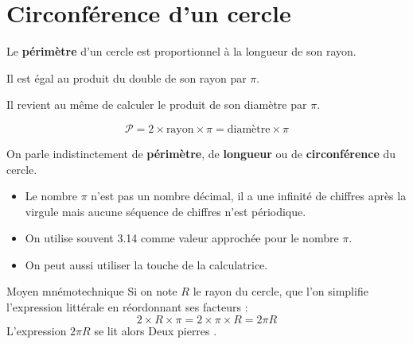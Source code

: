\section{Circonférence d'un cercle}
\begin{propriete}
    Le \textbf{périmètre} d'un cercle est proportionnel à la longueur de son rayon.

    Il est égal au produit du double de son rayon par $\pi$.

    Il revient au même de calculer le produit de son diamètre par $\pi$.

    $${\mathcal P} = 2\times \text{rayon} \times \pi = \text{diamètre}\times \pi$$
\end{propriete}

\begin{myvocabulaire}
    On parle indistinctement de {\bfseries périmètre}, de \textbf{longueur} ou de \textbf{circonférence} du cercle.
\end{myvocabulaire}

\begin{remarques}
    \begin{itemize}
        \item Le nombre $\pi$ n'est pas un nombre décimal, il a une infinité de chiffres après la virgule mais aucune séquence de chiffres n'est périodique.
        \item On utilise souvent \num{3.14} comme valeur approchée pour le nombre $\pi$.
        \item On peut aussi utiliser la touche \Calculatrice{/$\pi$} de la calculatrice.
    \end{itemize}
\end{remarques}

\begin{myBox}{ Moyen mnémotechnique }
    Si on note $R$ le rayon du cercle, que l'on simplifie l'expression littérale en réordonnant ses facteurs :
    $$2\times R \times \pi = 2 \times \pi \times R = 2\pi R$$
    L'expression $2\pi R$ se lit alors \og{} Deux pierres \fg{}.
\end{myBox}

